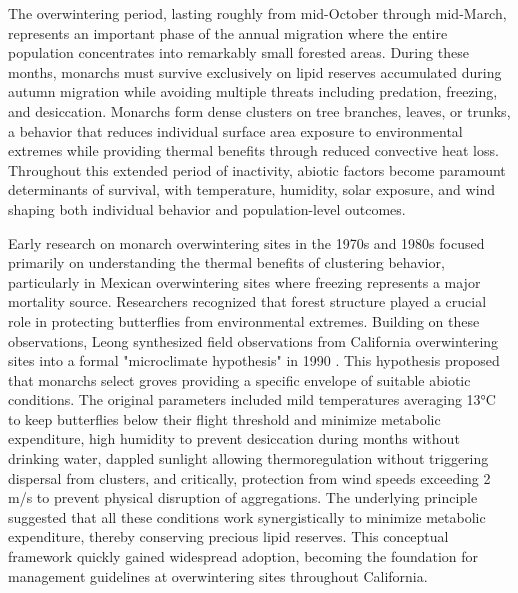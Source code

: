 The overwintering period, lasting roughly from mid-October through mid-March, represents an important phase of the annual migration where the entire population concentrates into remarkably small forested areas. During these months, monarchs must survive exclusively on lipid reserves accumulated during autumn migration while avoiding multiple threats including predation, freezing, and desiccation. Monarchs form dense clusters on tree branches, leaves, or trunks, a behavior that reduces individual surface area exposure to environmental extremes while providing thermal benefits through reduced convective heat loss. Throughout this extended period of inactivity, abiotic factors become paramount determinants of survival, with temperature, humidity, solar exposure, and wind shaping both individual behavior and population-level outcomes.

Early research on monarch overwintering sites in the 1970s and 1980s focused primarily on understanding the thermal benefits of clustering behavior, particularly in Mexican overwintering sites where freezing represents a major mortality source. Researchers recognized that forest structure played a crucial role in protecting butterflies from environmental extremes. Building on these observations, Leong synthesized field observations from California overwintering sites into a formal "microclimate hypothesis" in 1990 \citep{leongMicroenvironmentalFactorsAssociated1990}. This hypothesis proposed that monarchs select groves providing a specific envelope of suitable abiotic conditions. The original parameters included mild temperatures averaging 13°C to keep butterflies below their flight threshold and minimize metabolic expenditure, high humidity to prevent desiccation during months without drinking water, dappled sunlight allowing thermoregulation without triggering dispersal from clusters, and critically, protection from wind speeds exceeding 2 m/s to prevent physical disruption of aggregations. The underlying principle suggested that all these conditions work synergistically to minimize metabolic expenditure, thereby conserving precious lipid reserves. This conceptual framework quickly gained widespread adoption, becoming the foundation for management guidelines at overwintering sites throughout California.

